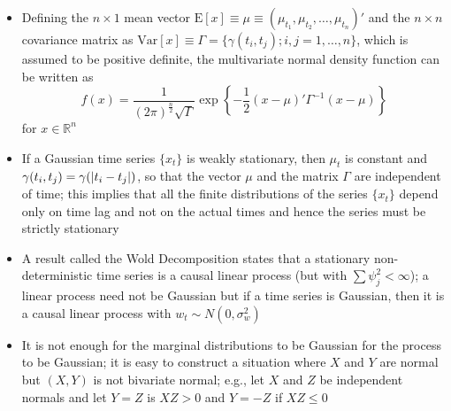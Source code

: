 \documentclass[12pt]{article}
\newcommand{\expe}[1]{\text{E}\left[ #1 \right]}
\renewcommand{\var}[1]{\text{Var}\left[ #1 \right]}
\begin{document}
\begin{itemize}
\item Defining the $n \times 1$ mean vector $\expe{x} \equiv \mu \equiv (\mu_{t_1},\mu_{t_2},\dots,\mu_{t_n})'$ and the $n\times n$ covariance matrix as $\var{x} \equiv \Gamma = \{\gamma(t_i,t_j); i,j = 1,\dots,n\}$, which is assumed to be positive definite, the multivariate normal density function can be written as $$ f(x) = \frac{1}{(2\pi)^{\frac{n}{2}} \sqrt{\Gamma}} \exp\left\{ -\frac{1}{2} (x - \mu)'\Gamma^{-1}(x-\mu)\right\} $$ for $x \in \mathbb{R}^n$
\item If a Gaussian time series $\{x_t\}$ is weakly stationary, then $\mu_t$ is constant and $\gamma(t_i,t_j) = \gamma(\abs{t_i - t_j})$, so that the vector $\mu$ and the matrix $\Gamma$ are independent of time;  this implies that all the finite distributions of the series $\{x_t\}$ depend only on time lag and not on the actual times and hence the series must be strictly stationary
\item A result called the Wold Decomposition states that a stationary non-deterministic time series is a causal linear process (but with $\sum \psi^2_j < \infty$); a linear process need not be Gaussian but if a time series is Gaussian, then it is a causal linear process with $w_t \sim N(0, \sigma^2_w)$
\item It is not enough for the marginal distributions to be Gaussian for the process to be Gaussian; it is easy to construct a situation where $X$ and $Y$ are normal but $(X,Y)$ is not bivariate normal; e.g., let $X$ and $Z$ be independent normals and let $Y = Z$ is $XZ > 0$ and $Y = -Z$ if $XZ \leq 0$
\end{itemize}
\end{document}
